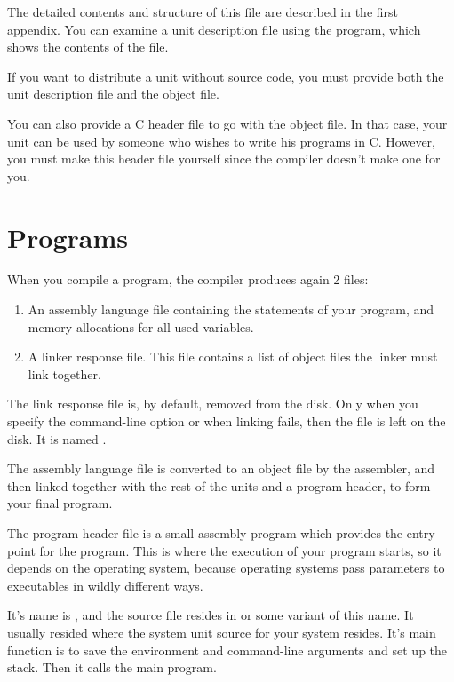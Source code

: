 The detailed contents and structure of this file are described in the first
appendix. You can examine a unit description file using the 
program, which shows the contents of the file.

If you want to distribute a unit without source code, you must provide both
the unit description file and the object file.

You can also provide a C header file to go with the object file. In that
case, your unit can be used by someone who wishes to write his programs in
C. However, you must make this header file yourself since the \fpc compiler
doesn't make one for you.

\section{Programs}
\label{se:Programs}

When you compile a program, the compiler produces again 2 files:
\begin{enumerate}
\item An assembly language file containing the statements of your program,
and memory allocations for all used variables.
\item A linker response file. This file contains a list of object files the
linker must link together.
\end{enumerate}
The link response file is, by default, removed from the disk. Only when you
specify the  command-line option or when linking fails, then the file
is left on the disk. It is named .

The assembly language file is converted to an object file by the assembler,
and then linked together with the rest of the units and a program header, to
form your final program.

The program header file is a small assembly program which provides the entry
point for the program. This is where the execution of your program starts,
so it depends on the operating system, because operating systems pass
parameters to executables in wildly different ways.

It's name is , and the
source file resides in  or some variant of this name. It
usually resided where the system unit source for your system resides.
It's main function is to save the environment and command-line arguments and
set up the stack. Then it calls the main program.

